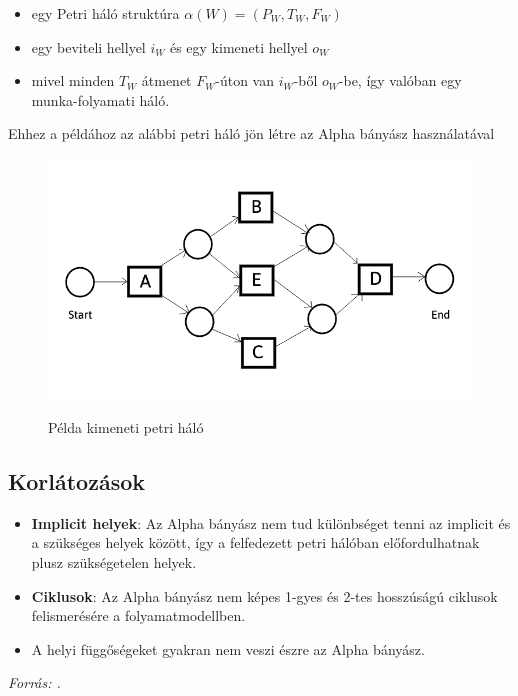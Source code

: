 \begin{itemize}
\item egy Petri háló struktúra $\alpha (W) = (P_W, T_W, F_W)$
\item egy beviteli hellyel $i_W$ és egy kimeneti hellyel $o_W$
\item mivel minden $T_W$ átmenet $F_W$-úton van $i_W$-ből $o_W$-be, így valóban egy munka\hyp{}folyamati háló.
\end{itemize}

\noindent Ehhez a példához az alábbi petri háló jön létre az Alpha bányász használatával
\begin{figure}[h]
\caption{Példa kimeneti petri háló}
\begin{center}
\includegraphics[width=\textwidth,height=\textheight,keepaspectratio]{images/img_alpha_petri_output}\\
\label{fig:example}
\end{center}
\end{figure}

 \newpage

\subsection{Korlátozások}
\begin{itemize}
\item \textbf{Implicit helyek}: Az Alpha bányász nem tud különbséget tenni az implicit és a szükséges helyek között, így a felfedezett petri hálóban előfordulhatnak plusz szükségetelen helyek.
\item \textbf{Ciklusok}: Az Alpha bányász nem képes 1-gyes és 2-tes hosszúságú ciklusok felismerésére a folyamatmodellben.
\item A helyi függőségeket gyakran nem veszi észre az Alpha bányász.
\end{itemize}

\textit{Forrás: \cite{wiki:001}.}\\




